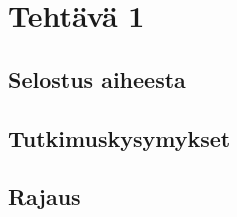 \documentclass{article}
\author{Ville Kumpulainen}
\begin{document}
\section{Tehtävä 1}
\subsection{Selostus aiheesta}


\subsection{Tutkimuskysymykset}


\subsection{Rajaus}

\end{document}

